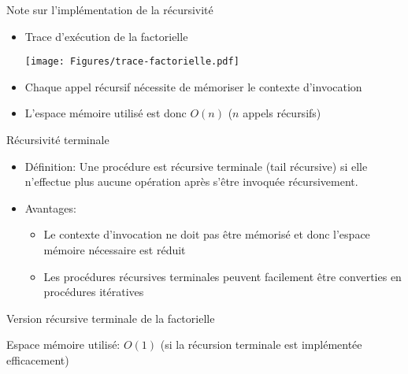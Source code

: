 \begin{frame}{Note sur l'implémentation de la récursivité}
\begin{itemize}
\item Trace d'exécution de la factorielle
\centerline{\texttt{[image: Figures/trace-factorielle.pdf]}}
\item Chaque appel récursif nécessite de mémoriser le \alert{contexte d'invocation}
\item L'espace mémoire utilisé est donc $O(n)$ ($n$ appels récursifs)
\end{itemize}
\end{frame}

\begin{frame}{Récursivité terminale}

\begin{itemize}
\item Définition: Une procédure est \alert{récursive terminale} (tail récursive) si elle n'effectue plus aucune opération après s'être invoquée récursivement.

\bigskip

\item Avantages:
\begin{itemize}
\item Le contexte d'invocation ne doit pas être mémorisé et donc l'espace mémoire nécessaire est réduit
\item Les procédures récursives terminales peuvent facilement être converties en procédures itératives
\end{itemize}
\end{itemize}

\end{frame}

\begin{frame}{Version récursive terminale de la factorielle}

\begin{center}
\end{center}

\begin{center}
\end{center}

\bigskip

Espace mémoire utilisé: $O(1)$ (si la récursion terminale est implémentée efficacement)

\end{frame}

